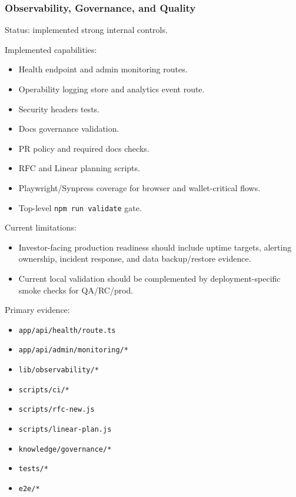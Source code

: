 \documentclass[
  10pt,
  letterpaper,
]{article}
\providecommand{\tightlist}{%
  \setlength{\itemsep}{0pt}\setlength{\parskip}{0pt}}
\let\oldtexttt\texttt
\renewcommand{\texttt}[1]{\oldtexttt{\small #1}}
\begin{document}
\subsubsection{Observability, Governance, and
Quality}\label{observability-governance-and-quality}

Status: implemented strong internal controls.

Implemented capabilities:

\begin{itemize}
\tightlist
\item
  Health endpoint and admin monitoring routes.
\item
  Operability logging store and analytics event route.
\item
  Security headers tests.
\item
  Docs governance validation.
\item
  PR policy and required docs checks.
\item
  RFC and Linear planning scripts.
\item
  Playwright/Synpress coverage for browser and wallet-critical flows.
\item
  Top-level \texttt{npm\ run\ validate} gate.
\end{itemize}

Current limitations:

\begin{itemize}
\tightlist
\item
  Investor-facing production readiness should include uptime targets,
  alerting ownership, incident response, and data backup/restore
  evidence.
\item
  Current local validation should be complemented by deployment-specific
  smoke checks for QA/RC/prod.
\end{itemize}

Primary evidence:

\begin{itemize}
\tightlist
\item
  \texttt{app/api/health/route.ts}
\item
  \texttt{app/api/admin/monitoring/*}
\item
  \texttt{lib/observability/*}
\item
  \texttt{scripts/ci/*}
\item
  \texttt{scripts/rfc-new.js}
\item
  \texttt{scripts/linear-plan.js}
\item
  \texttt{knowledge/governance/*}
\item
  \texttt{tests/*}
\item
  \texttt{e2e/*}
\end{itemize}
\end{document}
